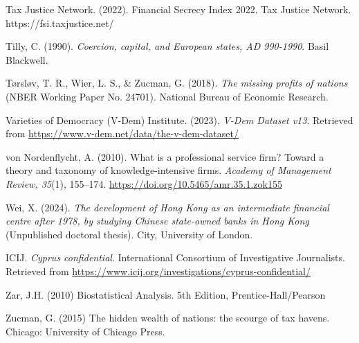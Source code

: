 \begin{thebibliography}{99}
Tax Justice Network. (2022). Financial Secrecy Index 2022. Tax Justice Network. https://fsi.taxjustice.net/

Tilly, C. (1990). \textit{Coercion, capital, and European states, AD 990-1990}. Basil Blackwell.

T{\o}rsl{\o}v, T. R., Wier, L. S., \& Zucman, G. (2018). \textit{The missing profits of nations} (NBER Working Paper No. 24701). National Bureau of Economic Research. 

Varieties of Democracy (V-Dem) Institute. (2023). \textit{V-Dem Dataset v13}. Retrieved from \url{https://www.v-dem.net/data/the-v-dem-dataset/}

von Nordenflycht, A. (2010). What is a professional service firm? Toward a theory and taxonomy of knowledge-intensive firms. \textit{Academy of Management Review, 35}(1), 155–174. \url{https://doi.org/10.5465/amr.35.1.zok155}

Wei, X. (2024). \textit{The development of Hong Kong as an intermediate financial centre after 1978, by studying Chinese state-owned banks in Hong Kong} (Unpublished doctoral thesis). City, University of London.

ICIJ. \textit{Cyprus confidential}. International Consortium of Investigative Journalists. Retrieved from \url{https://www.icij.org/investigations/cyprus-confidential/}

Zar, J.H. (2010) Biostatistical Analysis. 5th Edition, Prentice-Hall/Pearson

Zucman, G. (2015) The hidden wealth of nations: the scourge of tax havens. Chicago: University of Chicago Press.

\end{thebibliography}

